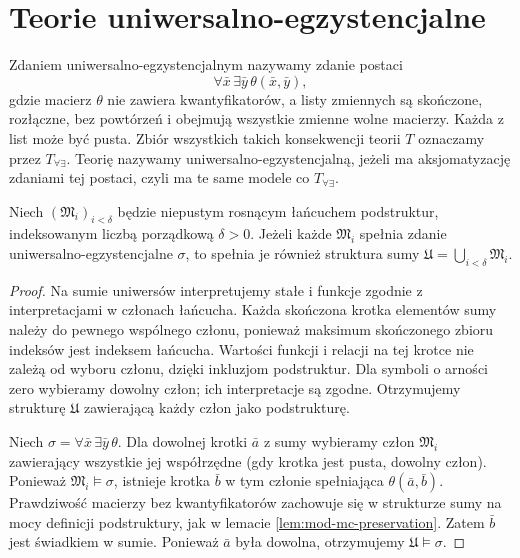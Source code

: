\section{Teorie uniwersalno-egzystencjalne}
\begin{definicja}
\label{def:mod-mc-forall-exists}
Zdaniem uniwersalno-egzystencjalnym nazywamy zdanie
postaci
\[
\forall\bar x\,\exists\bar y\,\theta(\bar x,\bar y),
\]
gdzie macierz $\theta$ nie zawiera kwantyfikatorów,
a listy zmiennych są skończone, rozłączne, bez powtórzeń
i obejmują wszystkie zmienne wolne macierzy.
Każda z list może być pusta. Zbiór wszystkich takich konsekwencji teorii
$T$ oznaczamy przez $T_{\forall\exists}$.
Teorię nazywamy uniwersalno-egzystencjalną, jeżeli
ma aksjomatyzację zdaniami tej postaci, czyli ma
te same modele co $T_{\forall\exists}$.
\end{definicja}

\begin{lemat}
\label{lem:mod-mc-chain-preservation}
Niech $(\mathfrak M_i)_{i<\delta}$ będzie niepustym
rosnącym łańcuchem podstruktur, indeksowanym liczbą
porządkową $\delta>0$. Jeżeli każde $\mathfrak M_i$
spełnia zdanie uniwersalno-egzystencjalne $\sigma$,
to spełnia je również struktura sumy
$\mathfrak U=\bigcup_{i<\delta}\mathfrak M_i$.
\end{lemat}
\begin{proof}
Na sumie uniwersów interpretujemy stałe i funkcje
zgodnie z interpretacjami w członach łańcucha.
Każda skończona krotka elementów sumy należy
do pewnego wspólnego członu, ponieważ maksimum
skończonego zbioru indeksów jest indeksem łańcucha.
Wartości funkcji i relacji na tej krotce nie zależą
od wyboru członu, dzięki inkluzjom podstruktur.
Dla symboli o arności zero wybieramy dowolny człon;
ich interpretacje są zgodne. Otrzymujemy strukturę
$\mathfrak U$ zawierającą każdy człon jako podstrukturę.

Niech $\sigma=\forall\bar x\,\exists\bar y\,\theta$.
Dla dowolnej krotki $\bar a$ z sumy wybieramy człon
$\mathfrak M_i$ zawierający wszystkie jej współrzędne
(gdy krotka jest pusta, dowolny człon). Ponieważ
$\mathfrak M_i\models\sigma$, istnieje krotka
$\bar b$ w tym członie spełniająca
$\theta(\bar a,\bar b)$. Prawdziwość macierzy bez
kwantyfikatorów zachowuje się w strukturze sumy
na mocy definicji podstruktury, jak w lemacie
\ref{lem:mod-mc-preservation}. Zatem $\bar b$ jest
świadkiem w sumie. Ponieważ $\bar a$ była dowolna,
otrzymujemy $\mathfrak U\models\sigma$.
\end{proof}

